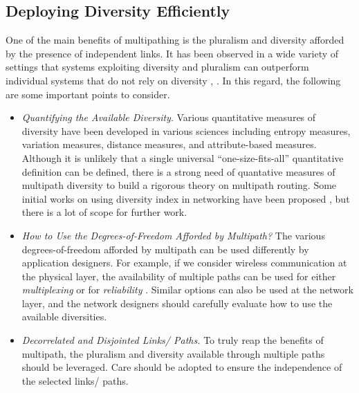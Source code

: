 \documentclass[10pt]{IEEEtran}
\begin{document}
\subsection{Deploying Diversity Efficiently}

One of the main benefits of multipathing is the pluralism and diversity afforded by the presence of independent links. It has been observed in a wide variety of settings that systems exploiting diversity and pluralism can outperform individual systems that do not rely on diversity \cite{surowiecki2005wisdom}, \cite{page2010diversity}. In this regard, the following are some important points to consider.

\begin{itemize}

\vspace{1mm}
\item \textit{Quantifying the Available Diversity}. Various quantitative measures of diversity have been developed in various sciences including entropy measures, variation measures, distance measures, and attribute-based measures\cite{page2010diversity}. Although it is unlikely that a single universal ``one-size-fits-all'' quantitative definition can be defined, there is a strong need of quantative measures of multipath diversity to build a rigorous theory on multipath routing. Some initial works on using diversity index in networking have been proposed \cite{dolev2010routing, chellappan2013application}, but there is a lot of scope for further work.

\vspace{1mm}
\item \textit{How to Use the Degrees-of-Freedom Afforded by Multipath?} The various degrees-of-freedom afforded by multipath can be used differently by application designers. For example, if we consider wireless communication at the physical layer, the availability of multiple paths can be used for either \textit{multiplexing} or for \textit{reliability} \cite{lozano2010transmit}. Similar options can also be used at the network layer, and the network designers should carefully evaluate how to use the available diversities.

\vspace{1mm}
\item \textit{Decorrelated and Disjointed Links/ Paths.}  To truly reap the benefits of multipath, the pluralism and diversity available through multiple paths should be leveraged. Care should be adopted to ensure the independence of the selected links/ paths.


\end{itemize}
\end{document}

